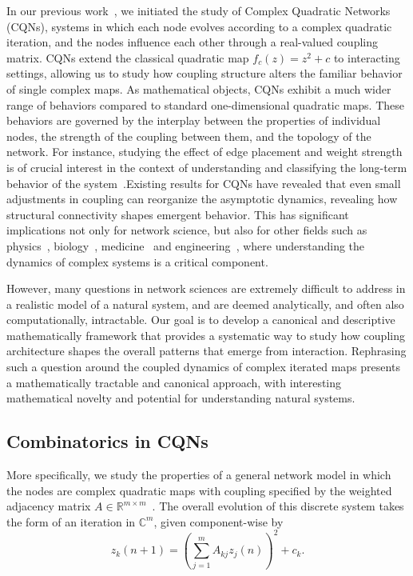 \documentclass[10pt]{article}
\begin{document}
In our previous work~\cite{Ariel,Simone,gender,AC2,DTI}, we initiated the study of Complex Quadratic Networks (CQNs), systems in which each node evolves according to a complex quadratic iteration, and the nodes influence each other through a real-valued coupling matrix. CQNs extend the classical quadratic map $f_c(z)=z^2+c$ to interacting settings, allowing us to study how coupling structure alters the familiar behavior of single complex maps. As mathematical objects, CQNs exhibit a much wider range of behaviors compared to standard  one-dimensional quadratic maps. These behaviors are governed by the interplay between the properties of individual nodes, the strength of the coupling between them, and the topology of the network. For instance, studying the effect of edge placement and weight strength is of crucial interest in the context of understanding and classifying the long-term behavior of the system~\cite{iniguez2020bridging,seabrook2021evaluating,faskowitz2022edges}.Existing results for CQNs have revealed that even small adjustments in coupling can reorganize the asymptotic dynamics, revealing how structural connectivity shapes emergent behavior. This has significant implications not only for network science, but also for other fields such as physics~\cite{robinson2022physics}, biology~\cite{ma2012biological,kahn2025network}, medicine~\cite{luppi2024contributions} and engineering~\cite{whitney2004influence}, where understanding the dynamics of complex systems is a critical component.

However, many questions in network sciences are extremely difficult to address in a realistic model of a natural system, and are deemed analytically, and often also computationally, intractable. Our goal is to develop a canonical and descriptive mathematically framework that provides a systematic way to study how coupling architecture shapes the overall patterns that emerge from interaction. Rephrasing such a question around the coupled dynamics of complex iterated maps presents a mathematically tractable and canonical approach, with interesting mathematical novelty and potential for understanding natural systems.


\subsection{Combinatorics in CQNs}

More specifically, we study the properties of a general network model in which the nodes are complex quadratic maps with coupling specified by the weighted adjacency matrix $A \in \mathbb{R}^{m \times m}$~\cite{AC2,Simone,Ariel}. The overall evolution of this discrete system takes the form of an iteration in $\mathbb{C}^m$, given component-wise by
\begin{equation} \label{eq.quadratic.system}
z_k(n + 1) = \left(\sum_{j = 1}^m A_{kj} z_j(n)\right)^2 + c_k.
\end{equation}
\end{document}
